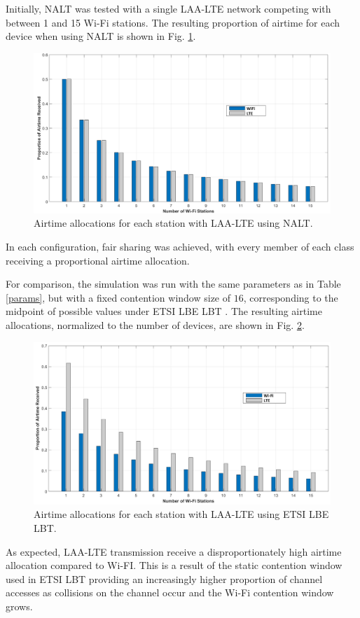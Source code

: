 Initially, NALT was tested with a single \mbox{LAA-LTE} network competing with between 1 and 15 \mbox{Wi-Fi} stations.  The resulting proportion of airtime for each device when using NALT is shown in Fig. \ref{basic-results}.
\begin{figure}[!ht]	
	\includegraphics[width=\textwidth]{figs/NALT-1-15}
	\caption{Airtime allocations for each station with \mbox{LAA-LTE} using NALT.}
	\label{basic-results}
\end{figure}
In each configuration, fair sharing was achieved, with every member of each class receiving a proportional airtime allocation. 

For comparison, the simulation was run with the same parameters as in Table \ref{params}, but with a fixed contention window size of $16$, corresponding to the midpoint of possible values under ETSI LBE LBT \cite{3gpp}. The resulting airtime allocations, normalized to the number of devices, are shown in Fig. \ref{compresults}.
\begin{figure}[!ht]
	\includegraphics[width=\textwidth]{figs/ETSIforComp}
	\caption{Airtime allocations for each station with \mbox{LAA-LTE} using ETSI LBE LBT.}
	\label{compresults}
\end{figure}
As expected, \mbox{LAA-LTE} transmission receive a disproportionately high airtime allocation compared to Wi-FI.  This is a result of the static contention window used in ETSI LBT providing an increasingly higher proportion of channel accesses as collisions on the channel occur and the \mbox{Wi-Fi} contention window grows.

